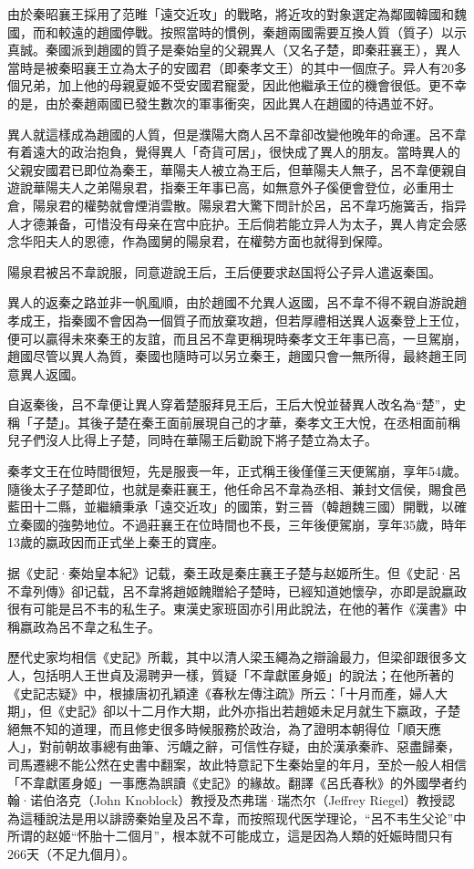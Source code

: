 由於秦昭襄王採用了范睢「遠交近攻」的戰略，將近攻的對象選定為鄰國韓國和魏國，而和較遠的趙國停戰。按照當時的慣例，秦趙兩國需要互換人質（質子）以示真誠。秦國派到趙國的質子是秦始皇的父親異人（又名子楚，即秦莊襄王），異人當時是被秦昭襄王立為太子的安國君（即秦孝文王）的其中一個庶子。异人有20多個兄弟，加上他的母親夏姬不受安國君寵愛，因此他繼承王位的機會很低。更不幸的是，由於秦趙兩國已發生數次的軍事衝突，因此異人在趙國的待遇並不好。

異人就這樣成為趙國的人質，但是濮陽大商人呂不韋卻改變他晚年的命運。呂不韋有着遠大的政治抱負，覺得異人「奇貨可居」，很快成了異人的朋友。當時異人的父親安國君已即位為秦王，華陽夫人被立為王后，但華陽夫人無子，呂不韋便親自遊說華陽夫人之弟陽泉君，指秦王年事已高，如無意外子傒便會登位，必重用士倉，陽泉君的權勢就會煙消雲散。陽泉君大驚下問計於呂，呂不韋巧施簧舌，指异人才德兼备，可惜没有母亲在宫中庇护。王后倘若能立异人为太子，異人肯定会感念华阳夫人的恩德，作為國舅的陽泉君，在權勢方面也就得到保障。

陽泉君被呂不韋說服，同意遊說王后，王后便要求赵国将公子异人遣返秦国。

異人的返秦之路並非一帆風順，由於趙國不允異人返國，呂不韋不得不親自游說趙孝成王，指秦國不會因為一個質子而放棄攻趙，但若厚禮相送異人返秦登上王位，便可以贏得未來秦王的友誼，而且呂不韋更稱現時秦孝文王年事已高，一旦駕崩，趙國尽管以異人為質，秦國也隨時可以另立秦王，趙國只會一無所得，最終趙王同意異人返國。

自返秦後，吕不韋便让異人穿着楚服拜見王后，王后大悅並替異人改名為“楚”，史稱「子楚」。其後子楚在秦王面前展現自己的才華，秦孝文王大悅，在丞相面前稱兒子們沒人比得上子楚，同時在華陽王后勸說下將子楚立為太子。

秦孝文王在位時間很短，先是服喪一年，正式稱王後僅僅三天便駕崩，享年54歲。隨後太子子楚即位，也就是秦莊襄王，他任命呂不韋為丞相、兼封文信侯，賜食邑藍田十二縣，並繼續秉承「遠交近攻」的國策，對三晉（韓趙魏三國）開戰，以確立秦國的強勢地位。不過莊襄王在位時間也不長，三年後便駕崩，享年35歲，時年13歲的嬴政因而正式坐上秦王的寶座。

据《史記·秦始皇本紀》记载，秦王政是秦庄襄王子楚与赵姬所生。但《史記·呂不韋列傳》卻记载，呂不韋將趙姬餽贈給子楚時，已經知道她懷孕，亦即是說嬴政很有可能是吕不韦的私生子。東漢史家班固亦引用此說法，在他的著作《漢書》中稱嬴政為呂不韋之私生子。

歷代史家均相信《史記》所載，其中以清人梁玉繩為之辯論最力，但梁卻跟很多文人，包括明人王世貞及湯聘尹一樣，質疑「不韋獻匿身姬」的說法；在他所著的《史記志疑》中，根據唐初孔穎達《春秋左傳注疏》所云：「十月而產，婦人大期」，但《史記》卻以十二月作大期，此外亦指出若趙姬未足月就生下嬴政，子楚絕無不知的道理，而且修史很多時候服務於政治，為了證明本朝得位「順天應人」，對前朝故事總有曲筆、污衊之辭，可信性存疑，由於漢承秦祚、惡盡歸秦，司馬遷總不能公然在史書中翻案，故此特意記下生秦始皇的年月，至於一般人相信「不韋獻匿身姬」一事應為誤讀《史記》的緣故。翻譯《呂氏春秋》的外國學者约翰·诺伯洛克（John Knoblock）教授及杰弗瑞·瑞杰尔（Jeffrey Riegel）教授認為這種說法是用以誹謗秦始皇及呂不韋，而按照现代医学理论，“呂不韦生父论”中所谓的赵姬“怀胎十二個月”，根本就不可能成立，這是因為人類的妊娠時間只有266天（不足九個月）。

